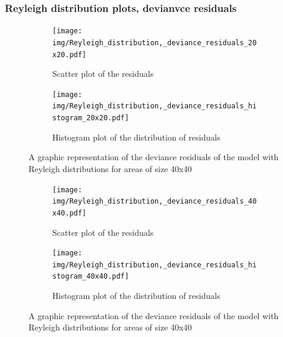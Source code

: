 \documentclass[12pt,a4paper,twoside]{article}
\begin{document}
\newpage

\subsubsection{Reyleigh distribution plots, devianvce residuals}
\label{sssec:reyleighdeviance}
\begin{figure}[!ht]
    \begin{subfigure}{.45\textwidth}
        \centering
        \texttt{[image: img/Reyleigh\_distribution,\_deviance\_residuals\_20x20.pdf]}
        \caption{Scatter plot of the residuals}
        \label{fig:reyleighdeviancescatter20}
    \end{subfigure}
    \begin{subfigure}{.45\textwidth}
        \centering
        \texttt{[image: img/Reyleigh\_distribution,\_deviance\_residuals\_histogram\_20x20.pdf]}
        \caption{Histogram plot of the distribution of residuals}
        \label{fig:reyleighdeviancehist20}
    \end{subfigure}
    \caption{A graphic representation of the deviance residuals of the model with Reyleigh
    distributions for areas of size 40x40}
    \label{fig:reyleighdeviancefig20}
\end{figure}

\begin{figure}[!ht]
    \begin{subfigure}{.45\textwidth}
        \centering
        \texttt{[image: img/Reyleigh\_distribution,\_deviance\_residuals\_40x40.pdf]}
        \caption{Scatter plot of the residuals}
        \label{fig:reyleighdeviancescatter40}
    \end{subfigure}
    \begin{subfigure}{.45\textwidth}
        \centering
        \texttt{[image: img/Reyleigh\_distribution,\_deviance\_residuals\_histogram\_40x40.pdf]}
        \caption{Histogram plot of the distribution of residuals}
        \label{fig:reyleighdeviancehist40}
    \end{subfigure}
    \caption{A graphic representation of the deviance residuals of the model with Reyleigh
    distributions for areas of size 40x40}
    \label{fig:reyleighdeviancefig40}
\end{figure}

\newpage
\end{document}
